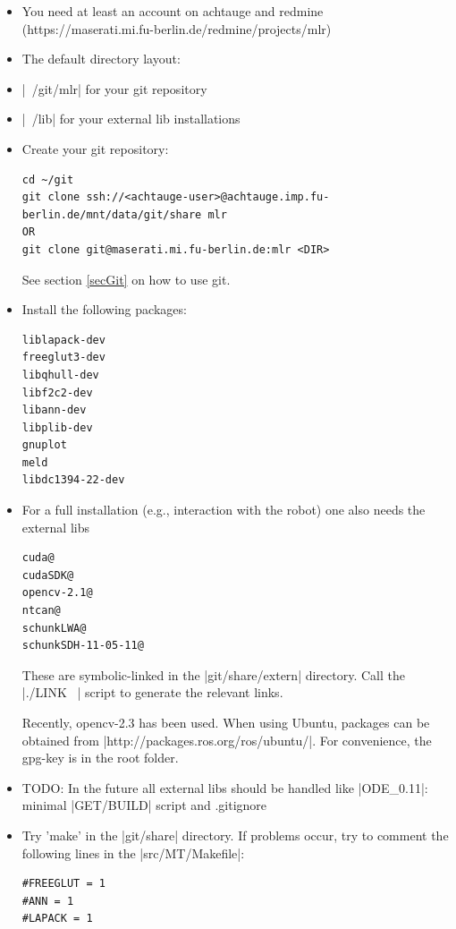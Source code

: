 \begin{itemize}
\item You need at least an account on achtauge and redmine
  (https://maserati.mi.fu-berlin.de/redmine/projects/mlr)

\item The default directory layout:
\bi
\item |~/git/mlr| for your git repository
\item |~/lib| for your external lib installations
\ei

\item Create your git repository:
\begin{code}
\begin{verbatim}
cd ~/git
git clone ssh://<achtauge-user>@achtauge.imp.fu-berlin.de/mnt/data/git/share mlr
OR
git clone git@maserati.mi.fu-berlin.de:mlr <DIR>
\end{verbatim}
\end{code}
See section \ref{secGit} on how to use git.

\item Install the following packages:
\begin{code}
\begin{verbatim}
liblapack-dev
freeglut3-dev
libqhull-dev
libf2c2-dev
libann-dev
libplib-dev
gnuplot
meld
libdc1394-22-dev
\end{verbatim}
\end{code}


\item For a full installation (e.g., interaction with the robot) one also
  needs the external libs
\begin{code}
\begin{verbatim}
cuda@
cudaSDK@
opencv-2.1@
ntcan@
schunkLWA@
schunkSDH-11-05-11@ 
\end{verbatim}
\end{code}

These are symbolic-linked in the |git/share/extern| directory. Call the
  |./LINK ~\lib| script to generate the relevant links.

Recently, opencv-2.3 has been used. When using Ubuntu, packages can be 
	obtained from |http://packages.ros.org/ros/ubuntu/|. For 
	convenience, the gpg-key is in the root folder.

\item TODO: In the future all external libs should be handled like
  |ODE_0.11|: minimal |GET/BUILD| script and .gitignore

\item Try 'make' in the |git/share| directory. If problems occur, try to
comment the following lines in the |src/MT/Makefile|:
\begin{code}
\begin{verbatim}
#FREEGLUT = 1
#ANN = 1
#LAPACK = 1
\end{verbatim}
\end{code}


\end{itemize}
